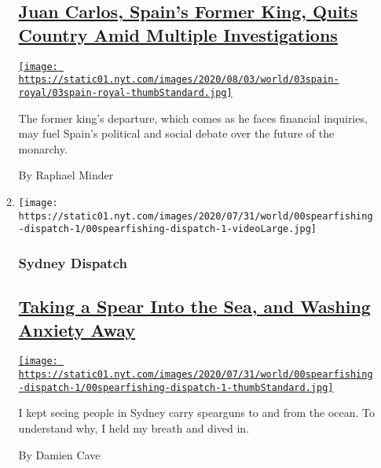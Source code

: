 \begin{enumerate}
\begin{enumerate}
    \hypertarget{juan-carlos-spains-former-king-quits-country-amid-multiple-investigations}{%
    \subsection{\texorpdfstring{\href{/2020/08/03/world/europe/juan-carlos-leaves-spain.html}{Juan
    Carlos, Spain's Former King, Quits Country Amid Multiple
    Investigations}}{Juan Carlos, Spain's Former King, Quits Country Amid Multiple Investigations}}\label{juan-carlos-spains-former-king-quits-country-amid-multiple-investigations}}

    \href{/2020/08/03/world/europe/juan-carlos-leaves-spain.html}{\texttt{[image: https://static01.nyt.com/images/2020/08/03/world/03spain-royal/03spain-royal-thumbStandard.jpg]}}

    The former king's departure, which comes as he faces financial
    inquiries, may fuel Spain's political and social debate over the
    future of the monarchy.

    By Raphael Minder
  \item
    \texttt{[image: https://static01.nyt.com/images/2020/07/31/world/00spearfishing-dispatch-1/00spearfishing-dispatch-1-videoLarge.jpg]}

    \hypertarget{sydney-dispatch}{%
    \subsubsection{Sydney Dispatch}\label{sydney-dispatch}}

    \hypertarget{taking-a-spear-into-the-sea-and-washing-anxiety-away}{%
    \subsection{\texorpdfstring{\href{/2020/08/03/world/australia/spearfishing-sydney-coronavirus.html}{Taking
    a Spear Into the Sea, and Washing Anxiety
    Away}}{Taking a Spear Into the Sea, and Washing Anxiety Away}}\label{taking-a-spear-into-the-sea-and-washing-anxiety-away}}

    \href{/2020/08/03/world/australia/spearfishing-sydney-coronavirus.html}{\texttt{[image: https://static01.nyt.com/images/2020/07/31/world/00spearfishing-dispatch-1/00spearfishing-dispatch-1-thumbStandard.jpg]}}

    I kept seeing people in Sydney carry spearguns to and from the
    ocean. To understand why, I held my breath and dived in.

    By Damien Cave
  \end{enumerate}
\end{enumerate}

